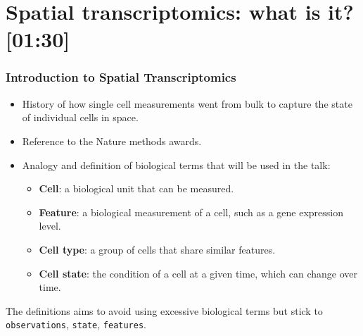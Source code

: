 
\section{Spatial transcriptomics: what is it? {[01:30]}}

\begin{frame}
    \frametitle{Introduction to Spatial Transcriptomics}
    \begin{block}{}
        \begin{itemize}
            \item History of how single cell measurements went from bulk to capture the state of individual cells in space.
            \item Reference to the Nature methods awards.
            \item Analogy and definition of biological terms that will be used in the talk:
                \begin{itemize}
                    \item \textbf{Cell}: a biological unit that can be measured.
                    \item \textbf{Feature}: a biological measurement of a cell, such as a gene expression level.
                    \item \textbf{Cell type}: a group of cells that share similar features.
                    \item \textbf{Cell state}: the condition of a cell at a given time, which can change over time.
                \end{itemize}
        \end{itemize}
    \end{block}
    The definitions aims to avoid using excessive biological terms but stick to \texttt{observations}, \texttt{state}, \texttt{features}.
\end{frame}

